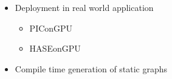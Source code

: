 \begin{itemize}
\item Deployment in real world application
  \begin{itemize}
  \item PIConGPU
  \item HASEonGPU
  \end{itemize}

\item Compile time generation of static graphs


\end{itemize}

\cleardoublepage

